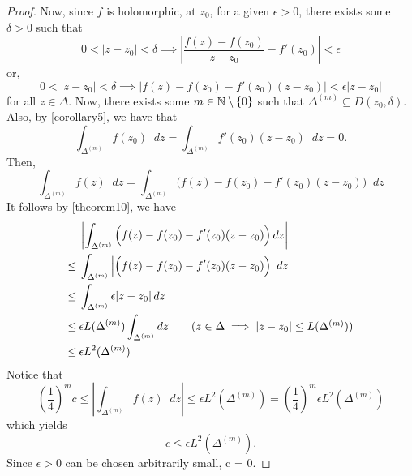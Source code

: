 \documentclass[11pt]{article}
\newcommand*\dif{\mathop{}\!d}
\begin{document}
\begin{proof}
	Now, since $f$ is holomorphic, at $z_0$, for a given $\epsilon > 0$, there
	exists some $\delta > 0$ such that
	\begin{equation*}
		0 < |z-z_0| < \delta \implies \left|\frac{f(z)-f(z_0)}{z-z_0} -
		f'(z_0)\right| < \epsilon
	\end{equation*}
	or,
	\begin{equation*}
		0 < |z-z_0| < \delta \implies \left|f(z)-f(z_0)-f'(z_0)(z-z_0)|
		< \epsilon|z-z_0|
	\end{equation*}
	for all $z \in \Delta$. Now, there exists some $m \in \mathbb{N} \setminus \{0\}$
	such that $\Delta^{(m)} \subseteq D(z_0, \delta)$. Also, by
	\cref{corollary5}, we have that
	\begin{equation*}
		\int_{\Delta^{(m)}} f(z_0) \dif z = \int_{\Delta^{(m)}} f'(z_0)(z-z_0)
		\dif z = 0.
	\end{equation*}
	Then,
	\begin{equation*}
		\int_{\Delta^{(m)}} f(z) \dif z = \int_{\Delta^{(m)}} \Big(f(z)-f(z_0)
		- f'(z_0)(z-z_0)\Big) \dif z
	\end{equation*}
	It follows by \cref{theorem10}, we have
	\begin{align*}
		&\>\left|\int_{\Delta^{(m)}} \Big(f(z)-f(z_0)-f'(z_0)(z-z_0)\Big)
		\dif z\right|\\
		\leq&\>\int_{\Delta^{(m)}}\left|\Big(f(z)-f(z_0)-f'(z_0)(z -
		z_0)\Big) \right| \dif z\\
		\leq&\>\int_{\Delta^{(m)}} \epsilon|z-z_0| \dif z\\
		\leq&\>\epsilon L(\Delta^{(m)})\int_{\Delta^{(m)}} \dif z \tag{$z \in
		\Delta\implies|z-z_0|\leq L(\Delta^{(m)})$}\\
		\leq&\>\epsilon L^2(\Delta^{(m)})
	\end{align*}
	Notice that
	\begin{equation*}
		\left(\frac{1}{4}\right)^m c \leq \left|\int_{\Delta^{(m)}}f(z)\dif z
		\right|\leq \epsilon L^2(\Delta^{(m)}) =
		\left(\frac{1}{4}\right)^m\epsilon L^2(\Delta^{(m)})
	\end{equation*}
	which yields
	\begin{equation*}
		c \leq \epsilon L^2(\Delta^{(m)}).
	\end{equation*}
	Since $\epsilon >0$ can be chosen arbitrarily small, c = 0.
\end{proof}

\pagebreak
\end{document}
